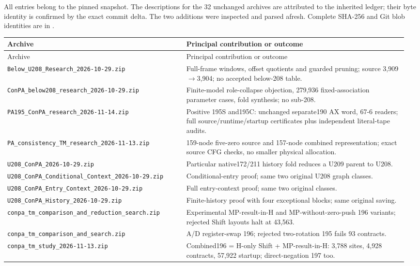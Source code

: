 All entries belong to the pinned snapshot. The descriptions for the 32 unchanged
archives are attributed to the inherited ledger; their byte identity is confirmed
by the exact commit delta. The two additions were inspected and parsed afresh.
Complete SHA-256 and Git blob identities are in .
\small\begin{longtable}{@{}p{0.43\linewidth}p{0.53\linewidth}@{}}
\toprule Archive & Principal contribution or outcome\\\midrule\endfirsthead
\toprule Archive & Principal contribution or outcome\\\midrule\endhead
\bottomrule\endfoot
\nolinkurl{Below_U208_Research_2026-10-29.zip} & Full-frame windows, offset quotients and guarded pruning; source 3,909$\to$3,904; no accepted below-208 table.\\[4pt]
\nolinkurl{ConPA_below208_research_2026-10-29.zip} & Finite-model role-collapse objection, 279,936 fixed-association parameter cases, fold synthesis; no sub-208.\\[4pt]
\nolinkurl{PA195_ConPA_research_2026-11-14.zip} & Positive 195S and195C: unchanged separate190 AX word, 67-6 readers; full source/runtime/startup certificates plus independent literal-tape audits.\\[4pt]
\nolinkurl{PA_consistency_TM_research_2026-11-13.zip} & 159-node five-zero source and 157-node combined representation; exact source CFG checks, no smaller physical allocation.\\[4pt]
\nolinkurl{U208_ConPA_2026-10-29.zip} & Particular native172/211 history fold reduces a U209 parent to U208.\\[4pt]
\nolinkurl{U208_ConPA_Conditional_Context_2026-10-29.zip} & Conditional-entry proof; same two original U208 graph classes.\\[4pt]
\nolinkurl{U208_ConPA_Entry_Context_2026-10-29.zip} & Full entry-context proof; same two original classes.\\[4pt]
\nolinkurl{U208_ConPA_History_2026-10-29.zip} & Finite-history proof with four exceptional blocks; same original saving.\\[4pt]
\nolinkurl{conpa_tm_comparison_and_reduction_search.zip} & Experimental MP-result-in-H and MP-without-zero-push 196 variants; rejected Shift layouts halt at 43,563.\\[4pt]
\nolinkurl{conpa_tm_comparison_and_search.zip} & A/D register-swap 196; rejected two-rotation 195 fails 93 contracts.\\[4pt]
\nolinkurl{conpa_tm_study_2026-11-13.zip} & Combined196 = H-only Shift + MP-result-in-H: 3,788 sites, 4,928 contracts, 57,922 startup; direct-negation 197 too.\\[4pt]

\end{longtable}
